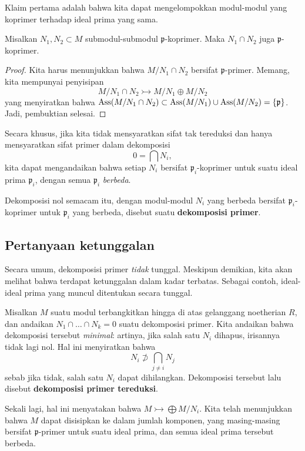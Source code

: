 Klaim pertama adalah bahwa kita dapat mengelompokkan modul-modul yang koprimer terhadap
ideal prima yang sama. 
\begin{lemma} 
Misalkan $N_1, N_2 \subset M$ submodul-submodul $\mathfrak{p}$-koprimer. Maka $N_1 \cap
N_2$ juga $\mathfrak{p}$-koprimer.
\end{lemma} 
\begin{proof} 
Kita harus menunjukkan bahwa $M/N_1 \cap N_2$ bersifat $\mathfrak{p}$-primer. Memang, kita mempunyai penyisipan
\[ M/N_1 \cap N_2 \rightarrowtail  M/N_1 \oplus M/N_2  \]
yang menyiratkan bahwa $\operatorname{Ass}(M/N_1 \cap N_2) \subset \operatorname{Ass}(M/N_1) \cup \operatorname{Ass}(M/N_2) =
\left\{\mathfrak{p}\right\}$. Jadi, pembuktian selesai. 
\end{proof} 

Secara khusus, jika kita tidak mensyaratkan sifat tak tereduksi dan hanya mensyaratkan sifat primer dalam
dekomposisi
\[ 0 = \bigcap N_i,  \]
kita dapat mengandaikan bahwa setiap $N_i$ bersifat $\mathfrak{p}_i$-koprimer untuk suatu
 ideal prima
$\mathfrak{p}_i$, dengan semua $\mathfrak{p}_i$ \emph{berbeda}.

\begin{definition} 
Dekomposisi nol semacam itu, dengan modul-modul $N_i$ yang berbeda bersifat
$\mathfrak{p}_i$-koprimer untuk $\mathfrak{p}_i$ yang berbeda, disebut suatu \textbf{dekomposisi primer}.
\end{definition} 



\subsection{Pertanyaan ketunggalan}

Secara umum, dekomposisi primer \emph{tidak} tunggal. Meskipun demikian, kita akan
melihat bahwa terdapat ketunggalan dalam kadar terbatas. Sebagai contoh, ideal-ideal prima
yang muncul ditentukan secara tunggal.

Misalkan $M$ suatu modul terbangkitkan hingga di atas gelanggang noetherian $R$, dan andaikan
$N_1 \cap \dots \cap N_k = 0$ suatu dekomposisi primer.
Kita andaikan bahwa dekomposisi tersebut
\emph{minimal}: artinya, jika salah satu $N_i$ dihapus, irisannya tidak lagi
nol.
Hal ini menyiratkan bahwa
\[ N_i \not\supset \bigcap_{j \neq i} N_j  \]
sebab jika tidak, salah satu $N_i$ dapat dihilangkan. Dekomposisi tersebut lalu disebut \textbf{dekomposisi primer tereduksi}.

Sekali lagi, hal ini menyatakan bahwa $M \rightarrowtail  \bigoplus M/N_i$. Kita telah
menunjukkan bahwa $M$ dapat disisipkan ke dalam jumlah komponen, yang masing-masing
bersifat $\mathfrak{p}$-primer untuk suatu ideal prima, dan semua ideal prima tersebut berbeda.

